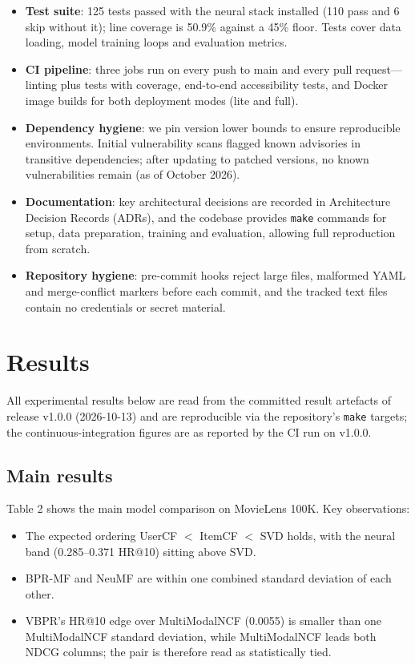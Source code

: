 \documentclass[11pt,a4paper]{article}
\begin{document}
\begin{itemize}[leftmargin=1.6em,itemsep=1pt,topsep=3pt]
  \item \textbf{Test suite}: 125 tests passed with the neural stack installed
        (110 pass and 6 skip without it); line coverage is 50.9\% against a 45\%
        floor. Tests cover data loading, model training loops and evaluation
        metrics.
  \item \textbf{CI pipeline}: three jobs run on every push to main and every
        pull request---linting plus tests with coverage, end-to-end
        accessibility tests, and Docker image builds for both deployment modes
        (lite and full).
  \item \textbf{Dependency hygiene}: we pin version lower bounds to ensure
        reproducible environments. Initial vulnerability scans flagged known
        advisories in transitive dependencies; after updating to patched
        versions, no known vulnerabilities remain (as of October 2026).
  \item \textbf{Documentation}: key architectural decisions are recorded in
        Architecture Decision Records (ADRs), and the codebase provides
        \texttt{make} commands for setup, data preparation, training and
        evaluation, allowing full reproduction from scratch.
  \item \textbf{Repository hygiene}: pre-commit hooks reject large files,
        malformed YAML and merge-conflict markers before each commit, and the
        tracked text files contain no credentials or secret material.
\end{itemize}

\section{Results}
All experimental results below are read from the committed result artefacts of
release v1.0.0 (2026-10-13) and are reproducible via the repository's
\texttt{make} targets; the continuous-integration figures are as reported by the
CI run on v1.0.0.

\subsection{Main results}
Table 2 shows the main model comparison on MovieLens 100K. Key observations:

\begin{itemize}[leftmargin=1.6em,itemsep=1pt,topsep=3pt]
  \item The expected ordering UserCF $<$ ItemCF $<$ SVD holds, with the neural
        band (0.285--0.371 HR@10) sitting above SVD.
  \item BPR-MF and NeuMF are within one combined standard deviation of each
        other.
  \item VBPR's HR@10 edge over MultiModalNCF (0.0055) is smaller than one
        MultiModalNCF standard deviation, while MultiModalNCF leads both NDCG
        columns; the pair is therefore read as statistically tied.
\end{itemize}
\end{document}
